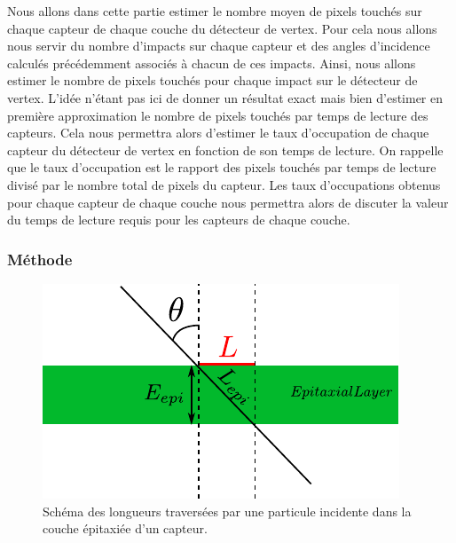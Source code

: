   Nous allons dans cette partie estimer le nombre moyen de pixels touch\'es sur chaque capteur de chaque couche du d\'etecteur de vertex. Pour cela nous allons nous servir du nombre d'impacts sur chaque capteur et des angles d'incidence calcul\'es pr\'ec\'edemment associ\'es \`a chacun de ces impacts. Ainsi, nous allons estimer le nombre de pixels touch\'es pour chaque impact sur le d\'etecteur de vertex. L'id\'ee n'\'etant pas ici de donner un résultat exact mais bien d'estimer en premi\`ere approximation le nombre de pixels touch\'es par temps de lecture des capteurs. Cela nous permettra alors d'estimer le taux d'occupation de chaque capteur du d\'etecteur de vertex en fonction de son temps de lecture. On rappelle que le taux d'occupation est le rapport des pixels touch\'es par temps de lecture divis\'e par le nombre total de pixels du capteur. Les taux d'occupations obtenus pour chaque capteur de chaque couche nous permettra alors de discuter la valeur du temps de lecture requis pour les capteurs de chaque couche.
  
  \subsubsection{M\'ethode}
 
  \begin{figure}[!htb]
    \begin{center}
      \includegraphics[scale=1.0]{./figures/multiplicity_approx.pdf}
      \caption{Sch\'ema des longueurs travers\'ees par une particule incidente dans la couche \'epitaxi\'ee d'un capteur.}
      \label{fig:SchemaApproxMultiplicity}
    \end{center}
  \end{figure}
 
